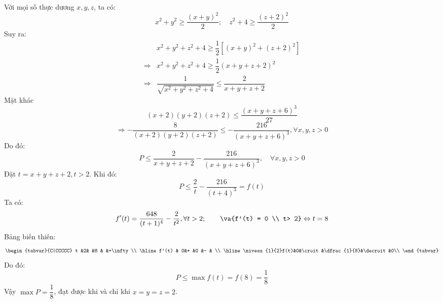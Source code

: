 \lgi
Với mọi số thực dương $x,y,z$, ta có:
$$x^2+y^2\geq \dfrac{(x+y)^2}{2}; \quad z^2+4 \geq \dfrac{(z+2)^2}{2}$$
Suy ra:
\begin{align*}
& x^2+y^2+z^2+4 \geq \dfrac{1}{2}\left[(x+y)^2+(z+2)^2\right] \\
\Rightarrow & x^2+y^2+z^2+4 \geq \dfrac{1}{2}\left(x+y+z+2\right)^2\\
\Rightarrow & \dfrac{1}{\sqrt{x^2+y^2+z^2+4}} \leq \dfrac{2}{x+y+z+2}
\end{align*}
Mặt khác
$$(x+2)(y+2)(z+2) \leq \dfrac{(x+y+z+6)^3}{27} $$
$$ \Rightarrow - \dfrac{8}{(x+2)(y+2)(z+2)} \leq - \dfrac{216}{(x+y+z+6)^3}, \forall x, y, z > 0$$
Do đó:
$$P \leq \dfrac{2}{x+y+z+2}-\dfrac{216}{(x+y+z+6)^3}, \quad  \forall x, y, z > 0$$
Đặt $t=x+y+z+2, t > 2$. Khi đó:
$$P \leq \dfrac{2}{t}-\dfrac{216}{(t+4)^3}=f(t)$$
Ta có:
$$f'(t)=\dfrac{648}{(t+1)^4}-\dfrac{2}{t^2}, \forall t > 2;\quad \quad \va{f'(t) = 0 \\ t> 2} \Leftrightarrow t = 8$$
Bảng biến thiên:
\[\begin{tabvar}{C|CCCCC}
t             &2&      &8          &        &+\infty\\
\hline
f'(t)         & 0&+     &0          &-       & \\
\hline
\niveau{1}{2}f(t)&0&\croit&\dfrac{1}{8}&\decroit&0\\
\end{tabvar}\]
Do đó:
$$P \leq \max f(t) = f(8) = \dfrac{1}{8}$$
Vậy $\max P = \dfrac{1}{8}$, đạt được khi và chỉ khi $x=y=z=2$.
